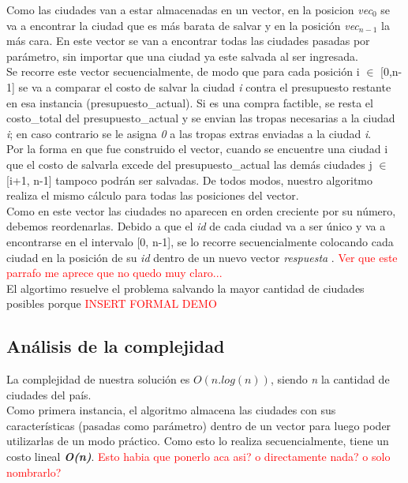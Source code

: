 \documentclass[a4paper]{article}
\begin{document}
 Como las ciudades van a estar almacenadas en un vector, en la posicion \textit{vec}$_0$ se va a encontrar la ciudad que es m\'as barata de salvar y en la posici\'on \textit{vec}$_{n-1}$ la m\'as cara. En este vector se van a encontrar todas las ciudades pasadas por par\'ametro, sin importar que una ciudad ya este salvada al ser ingresada.\\
 
 Se recorre este vector secuencialmente, de modo que para cada posici\'on i $\in$ [0,n-1] se va a comparar el costo de salvar la ciudad \emph{i} contra el presupuesto restante en esa instancia (presupuesto_actual). Si es una compra factible, se resta el costo_total del presupuesto_actual y se envian las tropas necesarias a la ciudad \emph{i}; en caso contrario se le asigna \emph{0} a las tropas extras enviadas a la ciudad \emph{i}. \\
 
 Por la forma en que fue construido el vector, cuando se encuentre una ciudad i que el costo de salvarla excede del presupuesto_actual las dem\'as ciudades j $\in$ [i+1, n-1] tampoco podr\'an ser salvadas. De todos modos, nuestro algoritmo realiza el mismo c\'alculo para todas las posiciones del vector.\\
 
Como en este vector las ciudades no aparecen en orden creciente por su n\'umero, debemos reordenarlas. Debido a que el \emph{id} de cada ciudad va a ser \'unico y va a encontrarse en el intervalo [0, n-1], se lo recorre secuencialmente colocando cada ciudad en la posici\'on de su \textit{id} dentro de un nuevo vector \emph{respuesta} . \textcolor{red}{Ver que este parrafo me aprece que no quedo muy claro...} \\
 
 
 

El algortimo resuelve el problema salvando la mayor cantidad de ciudades posibles porque
\textcolor{red}{INSERT FORMAL DEMO}

\newpage
\subsection{An\'alisis de la complejidad}
La complejidad de nuestra soluci\'on es $O(n.log(n))$, siendo \emph{n} la cantidad de ciudades del pa\'is.\\



Como primera instancia, el algoritmo almacena las ciudades con sus caracter\'isticas (pasadas como par\'ametro) dentro de un vector para luego poder utilizarlas de un modo pr\'actico. Como esto lo realiza secuencialmente, tiene un costo lineal \textbf{\textit{O(n)}}. \textcolor{red}{Esto habia que ponerlo aca asi? o directamente nada? o solo nombrarlo?}\\
\end{document}
